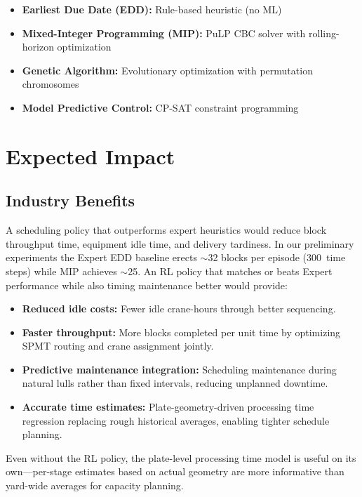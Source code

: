 \documentclass[12pt,letterpaper]{article}
\begin{document}
\begin{itemize}[leftmargin=1.5em]
  \item \textbf{Earliest Due Date (EDD):} Rule-based heuristic (no ML)
  \item \textbf{Mixed-Integer Programming (MIP):} PuLP CBC solver with rolling-horizon optimization
  \item \textbf{Genetic Algorithm:} Evolutionary optimization with permutation chromosomes
  \item \textbf{Model Predictive Control:} CP-SAT constraint programming
\end{itemize}

\section{Expected Impact}

\subsection{Industry Benefits}

A scheduling policy that outperforms expert heuristics would reduce block throughput time, equipment idle time, and delivery tardiness. In our preliminary experiments the Expert EDD baseline erects $\sim$32 blocks per episode (300~time steps) while MIP achieves $\sim$25. An RL policy that matches or beats Expert performance while also timing maintenance better would provide:

\begin{itemize}[leftmargin=1.5em]
  \item \textbf{Reduced idle costs:} Fewer idle crane-hours through better sequencing.
  \item \textbf{Faster throughput:} More blocks completed per unit time by optimizing SPMT routing and crane assignment jointly.
  \item \textbf{Predictive maintenance integration:} Scheduling maintenance during natural lulls rather than fixed intervals, reducing unplanned downtime.
  \item \textbf{Accurate time estimates:} Plate-geometry-driven processing time regression replacing rough historical averages, enabling tighter schedule planning.
\end{itemize}

Even without the RL policy, the plate-level processing time model is useful on its own---per-stage estimates based on actual geometry are more informative than yard-wide averages for capacity planning.
\end{document}
